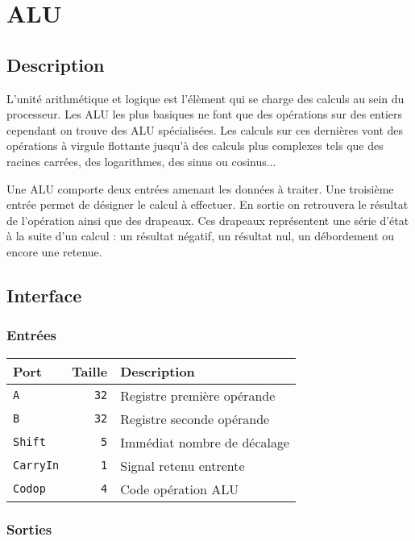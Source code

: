 \section{ALU}

\subsection{Description}

	L'unité arithmétique et logique est l'élèment qui se charge des calculs au sein du processeur. Les ALU les plus basiques ne font que des opérations sur des entiers cependant on trouve des ALU spécialisées. Les calculs sur ces dernières vont des opérations à virgule flottante jusqu'à des calculs plus complexes tels que des racines carrées, des logarithmes, des sinus ou cosinus...

	Une ALU comporte deux entrées amenant les données à traiter. Une troisième entrée permet de désigner le calcul à effectuer. En sortie on retrouvera le résultat de l'opération ainsi que des drapeaux. Ces drapeaux représentent une série d'état à la suite d'un calcul : un résultat négatif, un résultat nul, un débordement ou encore une retenue. 

\subsection{Interface}

\subsubsection{Entrées}

\begin{tabular}{|l|r|l|}
\hline
\textbf{Port}		& \textbf{Taille} & \textbf{Description}\\
\hline

\texttt{A}		& \texttt{32} & Registre première opérande\\
\hline
\texttt{B}		& \texttt{32} & Registre seconde opérande\\
\hline
\texttt{Shift}		&  \texttt{5} & Immédiat nombre de décalage\\
\hline
\texttt{CarryIn}	&  \texttt{1} & Signal retenu entrente\\
\hline
\texttt{Codop}		&  \texttt{4} & Code opération ALU\\

\hline
\end{tabular}


\subsubsection{Sorties}

